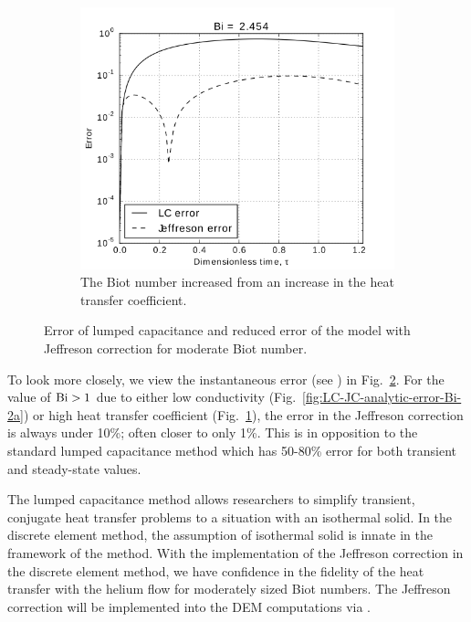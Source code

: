 \begin{figure}
        \begin{subfigure}[b]{0.5\textwidth}
                \includegraphics[width=\textwidth]{figures/LC-JC-analytic-error-Bi-2b}
                \caption{The Biot number increased from  an increase in the heat transfer coefficient.}
				\label{fig:LC-JC-analytic-error-Bi-2b}
        \end{subfigure}
        \caption[Error of lumped capacitance and Jeffreson correction for moderate Biot number]{Error of lumped capacitance and reduced error of the model with Jeffreson correction for moderate Biot number.}\label{fig:LC-JC-analytic-error-Bi-2}
\end{figure}

To look more closely, we view the instantaneous error (see ) in Fig.~\ref{fig:LC-JC-analytic-error-Bi-2}. For the value of $\mathrm{Bi} > 1$ due to either low conductivity (Fig.~\ref{fig:LC-JC-analytic-error-Bi-2a}) or high heat transfer coefficient (Fig.~\ref{fig:LC-JC-analytic-error-Bi-2b}), the error in the Jeffreson correction is always under 10\%; often closer to only 1\%. This is in opposition to the standard lumped capacitance method which has 50-80\% error for both transient and steady-state values.

The lumped capacitance method allows researchers to simplify transient, conjugate heat transfer problems to a situation with an isothermal solid. In the discrete element method, the assumption of isothermal solid is innate in the framework of the method. With the implementation of the Jeffreson correction in the discrete element method, we have confidence in the fidelity of the heat transfer with the helium flow for moderately sized Biot numbers. The Jeffreson correction will be implemented into the DEM computations via . 



